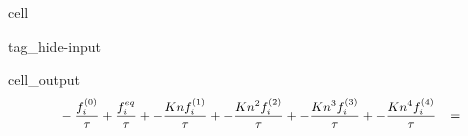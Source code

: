 \documentclass[letterpaper,10pt,english,openany,oneside]{jupyterBook}
\begin{document}
\begin{sphinxuseclass}{cell}
\begin{sphinxuseclass}{tag_hide-input}\begin{sphinxVerbatimOutput}

\begin{sphinxuseclass}{cell_output}\begin{equation*}
\begin{split}\displaystyle \small\begin{aligned}& - \frac{f_{i}^{(0)}}{\tau} + \frac{f_{i}^{eq}}{\tau} + - \frac{Kn f_{i}^{(1)}}{\tau} + - \frac{Kn^{2} f_{i}^{(2)}}{\tau} + - \frac{Kn^{3} f_{i}^{(3)}}{\tau} + - \frac{Kn^{4} f_{i}^{(4)}}{\tau} &= \end{aligned}\end{split}
\end{equation*}\begin{equation*}

\end{equation*}
\end{sphinxuseclass}
\end{sphinxVerbatimOutput}
\end{sphinxuseclass}
\end{sphinxuseclass}
\end{document}
